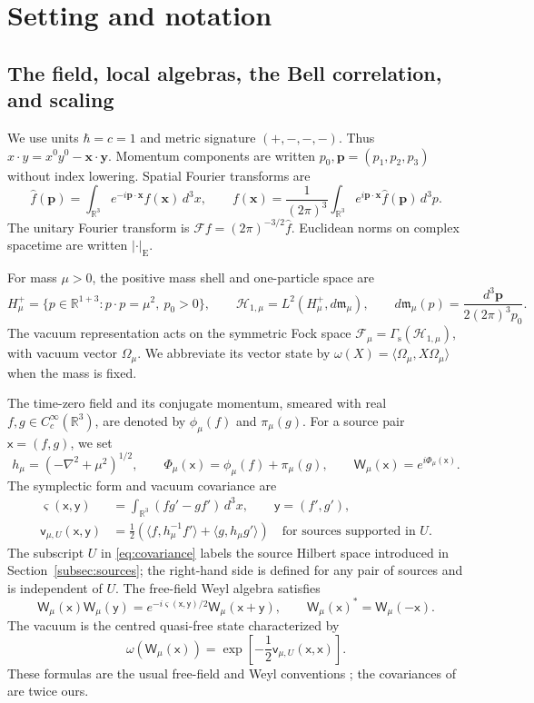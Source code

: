 \documentclass[11pt]{amsart}
\numberwithin{equation}{section}
\theoremstyle{definition}
\newcommand{\R}{\mathbb R}
\newcommand{\Hh}{\mathcal H}
\newcommand{\vv}{\mathsf v}
\newcommand{\sx}{\mathsf x}
\newcommand{\sy}{\mathsf y}
\newcommand{\bx}{\mathbf x}
\newcommand{\by}{\mathbf y}
\newcommand{\bp}{\mathbf p}
\newcommand{\ip}[2]{\langle #1,#2\rangle}
\newcommand{\wh}[1]{\widehat{#1}}
\begin{document}
\section{Setting and notation}\label{sec:setting}

\subsection{The field, local algebras, the Bell correlation, and scaling}

We use units \(\hbar=c=1\) and metric signature \((+,-,-,-)\).
Thus \(x\cdot y=x^0y^0-\bx\cdot\by\). Momentum components are written
\(p_0,\bp=(p_1,p_2,p_3)\) without index lowering. Spatial Fourier transforms are
\[
 \wh f(\bp)=\int_{\R^3}e^{-i\bp\cdot\bx}f(\bx)\,d^3x,\qquad
 f(\bx)=\frac1{(2\pi)^3}\int_{\R^3}e^{i\bp\cdot\bx}\wh f(\bp)\,d^3p.
\]
The unitary Fourier transform is
\(\mathcal Ff=(2\pi)^{-3/2}\wh f\). Euclidean norms on complex
spacetime are written \(|\cdot|_{\mathrm E}\).

For mass \(\mu>0\), the positive mass shell and one-particle space are
\[
 H_\mu^+=\{p\in\R^{1+3}:p\cdot p=\mu^2,\ p_0>0\},\qquad
 \Hh_{1,\mu}=L^2(H_\mu^+,d\mathfrak m_\mu),\qquad
 d\mathfrak m_\mu(p)=\frac{d^3\bp}{2(2\pi)^3p_0}.
\]
The vacuum representation acts on the symmetric Fock space
\(\mathscr F_\mu=\Gamma_{\mathrm s}(\Hh_{1,\mu})\), with vacuum vector
\(\Omega_\mu\). We abbreviate its vector state by
\(\omega(X)=\ip{\Omega_\mu}{X\Omega_\mu}\) when the mass is fixed.

The time-zero field and its conjugate momentum, smeared with real
\(f,g\in C_c^\infty(\R^3)\), are denoted by \(\phi_\mu(f)\) and
\(\pi_\mu(g)\). For a source pair \(\sx=(f,g)\), we set
\[
 h_\mu=(-\nabla^2+\mu^2)^{1/2},\qquad
 \Phi_\mu(\sx)=\phi_\mu(f)+\pi_\mu(g),\qquad
 \mathsf W_\mu(\sx)=e^{i\Phi_\mu(\sx)}.
\]
The symplectic form and vacuum covariance are
\begin{align}
 \varsigma(\sx,\sy)
 &=\int_{\R^3}(fg'-gf')\,d^3x,
 \qquad \sy=(f',g'),                                      \label{eq:symplectic}\\
 \vv_{\mu,U}(\sx,\sy)
 &=\frac12\left(\ip{f}{h_\mu^{-1}f'}+\ip{g}{h_\mu g'}\right)
 \quad\text{for sources supported in }U.                  \label{eq:covariance}
\end{align}
The subscript \(U\) in \eqref{eq:covariance} labels the source Hilbert space
introduced in Section~\ref{subsec:sources}; the right-hand side is
defined for any pair of sources and is independent of \(U\).
The free-field Weyl algebra satisfies
\[
 \mathsf W_\mu(\sx)\mathsf W_\mu(\sy)
 =e^{-i\varsigma(\sx,\sy)/2}\mathsf W_\mu(\sx+\sy),\qquad
 \mathsf W_\mu(\sx)^*=\mathsf W_\mu(-\sx).
\]
The vacuum is the centred quasi-free state characterized by
\[
 \omega(\mathsf W_\mu(\sx))
 =\exp\!\left[-\frac12\vv_{\mu,U}(\sx,\sx)\right].
\]
These formulas are the usual free-field and Weyl conventions
\cite{Haag96,SLW18}; the covariances of \cite{SLW18} are twice ours.
\end{document}
